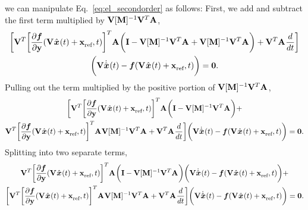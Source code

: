 \documentclass[3p,computermodern,10pt]{elsarticle}
\begin{document}
\begin{appendices}
we can manipulate Eq.~\eqref{eq:el_secondorder} as follows: %
First, we add and subtract the first term multiplied by $\basisspace [\massArgnt{n}]^{-1}\basisspace^T \stweightingMat$, 
\begin{multline*} 
\bigg[\basisspace^T \bigg[\frac{\partial \velocity}{\partial \stateyDiscrete}(\veloargsrom) \bigg]^T \stweightingMatArg{} \bigg( \mathbf{I} - \basisspace [\massArgnt{}]^{-1} \basisspace^T\stweightingMatArg{} + \basisspace [\massArgnt{}]^{-1} \basisspace^T \stweightingMatArg{} \bigg)  + \basisspace^T \stweightingMatArg{}  \frac{d}{dt} \bigg] \\ 
\bigg(  \basisspace \genstateDotArg{}{t}   -  \velocity(\veloargsrom) \bigg) = \bz.
\end{multline*}
Pulling out the term multiplied by the positive portion of $\basisspace [\massArgnt{}]^{-1} \basisspace^T \stweightingMatArg{}$,
\begin{multline*} 
\bigg[\basisspace^T \bigg[\frac{\partial \velocity}{\partial \stateyDiscrete} ( \veloargsrom) \bigg]^T \stweightingMatArg{}\bigg( \mathbf{I} - \basisspace [\massArgnt{}]^{-1}  \basisspace^T  \stweightingMatArg{} \bigg)  + \\ \basisspace^T \bigg[\frac{\partial \velocity}{\partial \stateyDiscrete} (\veloargsrom) \bigg]^T \stweightingMatArg{} \basisspace [\massArgnt{}]^{-1}  \basisspace^T \stweightingMatArg{} +   \basisspace^T \stweightingMatArg{} \frac{d}{dt} \bigg] \bigg(  \basisspace \genstateDotArg{}{t}   -  \velocity(\veloargsrom) \bigg) = \bz.
\end{multline*}
Splitting into two separate terms, 
\begin{multline*}
\basisspace^T \bigg[\frac{\partial \velocity}{\partial \stateyDiscrete}(\veloargsrom) \bigg]^T \stweightingMatArg{}\bigg( \mathbf{I} - \basisspace [\massArgnt{}]^{-1}  \basisspace^T \stweightingMatArg{} \bigg)  \bigg(  \basisspace \genstateDotArg{}{t}   -  \velocity(\veloargsrom) \bigg)  + \\  
\bigg[ \basisspace^T \bigg[\frac{\partial \velocity}{\partial \stateyDiscrete}(\veloargsrom) \bigg]^T \stweightingMatArg{} \basisspace [\massArgnt{}]^{-1} \basisspace^T \stweightingMatArg{} +   \basisspace^T \stweightingMatArg{} \frac{d}{dt} \bigg] \bigg(  \basisspace \genstateDotArg{}{t}  -  \velocity(\veloargsrom) \bigg) = \bz.

\end{multline*}
\end{appendices}
\end{document}

